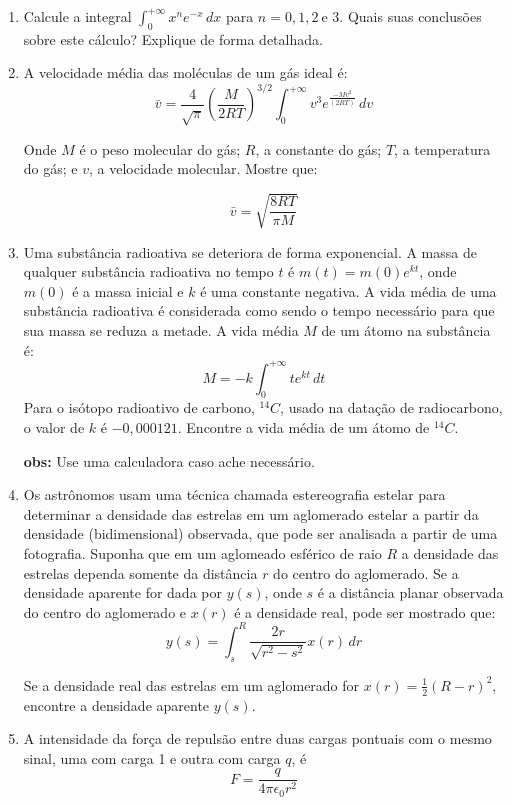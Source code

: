 \documentclass[11pt,a4paper]{article}
\newcommand{\integral}{\displaystyle\int}
\begin{document}
\begin{enumerate}
\begin{enumerate}
		
		\end{enumerate}
		
		\item Calcule a integral $\integral_0^{+\infty} x^n e^{-x} \, dx$ para $n = 0,1,2\ \textrm{e } 3$.
		Quais suas conclusões sobre este cálculo? Explique de forma detalhada.
		
		\item A velocidade média das moléculas de um gás ideal é:
		$$\bar{v} = \frac{4}{\sqrt{\pi}} \left(\frac{M}{2RT}\right)^{3/2} \integral_0^{+\infty} 				v^3e^{\frac{-Mv^2}{(2RT)}} \, dv$$
		
		Onde $M$ é o peso molecular do gás; $R$, a constante do gás; $T$, a temperatura do gás; e $v$,
		a velocidade molecular. Mostre que:
		
		$$\bar{v} = \sqrt{\frac{8RT}{\pi M}}$$
		
		\item Uma substância radioativa se deteriora de forma exponencial. A massa de qualquer substância
		radioativa no tempo $t$ é $m(t) = m(0)e^{kt}$, onde $m(0)$ é a massa inicial e $k$ é uma constante
		negativa. A vida média de uma substância radioativa é considerada como sendo o tempo necessário
		para que sua massa se reduza a metade. A vida média $M$ de um átomo na substância é: 
		$$M = -k\integral_0^{+\infty} te^{kt} \, dt$$ 
		Para o isótopo radioativo de carbono, $^{14}C$, usado na datação de radiocarbono, o valor de $k$
		é $-0,000121$. Encontre a vida média de um átomo de $^{14}C$.  
		
		\textbf{obs:} Use uma calculadora caso ache necessário.
		
		\item Os astrônomos usam uma técnica chamada estereografia estelar para determinar a densidade das 				estrelas em um aglomerado estelar a partir da densidade (bidimensional) observada, que pode ser 				analisada a partir de uma fotografia. Suponha que em um aglomeado esférico de raio $R$ a densidade 				das estrelas dependa somente da distância $r$ do centro do aglomerado. Se a densidade aparente for 				dada por $y(s)$, onde $s$ é a distância planar observada do centro do aglomerado e $x(r)$ é a 					densidade real, pode ser mostrado que:
		$$y(s) = \integral_s^R \frac{2r}{\sqrt{r^2 - s^2}} x(r) \, dr$$
		
		Se a densidade real das estrelas em um aglomerado for $x(r) = \frac{1}{2} (R - r)^2$, encontre a 				densidade aparente $y(s)$.
		
		\item A intensidade da força de repulsão entre duas cargas pontuais com o mesmo sinal, uma com 					carga 1 e outra com carga $q$, é
		$$F = \frac{q}{4\pi \epsilon_0r^2}$$


\end{enumerate}
\end{document}
